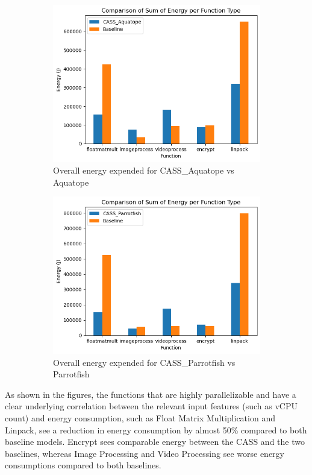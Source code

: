 \documentclass[times, 10pt,twocolumn]{article}
\begin{document}
\begin{figure}[h] %
   \centering
   \begin{subfigure}[b]{0.5\textwidth} %
         \centering
         \includegraphics[width=0.6\linewidth]{imgs/final_experiment_plots/energy_comparison/aquatope/overall.png}
         \caption{Overall energy expended for CASS\_Aquatope vs Aquatope}
         \label{fig:cassvsaquatope_energy}
   \end{subfigure}
   \begin{subfigure}[b]{0.5\textwidth} %
         \centering
         \includegraphics[width=0.6\linewidth]{imgs/final_experiment_plots/energy_comparison/parrotfish/overall.png}
         \caption{Overall energy expended for CASS\_Parrotfish vs Parrotfish}
         \label{fig:cassvsparrotfish_energy}
   \end{subfigure}
   \caption{}
\end{figure}

As shown in the figures, the functions that are highly parallelizable and have a clear underlying correlation between the relevant input features (such as vCPU count) and energy consumption, such as Float Matrix Multiplication and Linpack, see a reduction in energy consumption by almost 50\% compared to both baseline models. Encrypt sees comparable energy between the CASS and the two baselines, whereas Image Processing and Video Processing see worse energy consumptions compared to both baselines.
\end{document}
